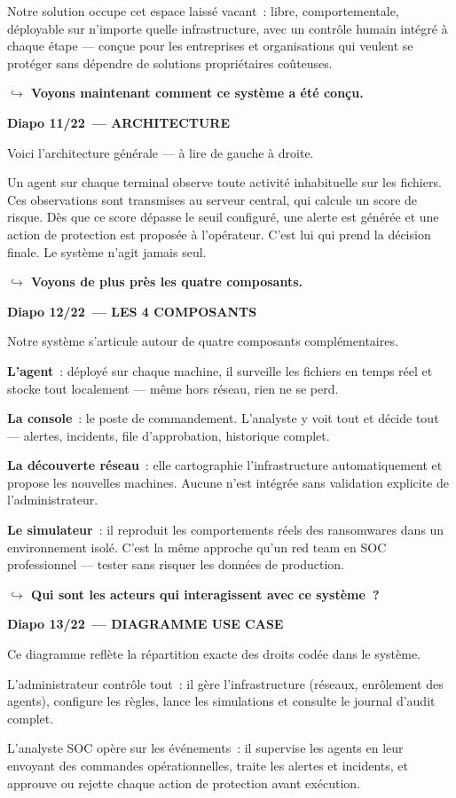 \documentclass[a4paper,11pt]{article}
\newcommand{\notehead}[2]{%
  \par\vspace{14pt}%
  {\color{white}\colorbox{primary}{\parbox{\dimexpr\linewidth-12pt}{\vspace{3pt}%
    \bfseries\large Diapo #1~--- #2\vspace{3pt}}}}%
  \par\vspace{6pt}%
}
\newcommand{\pivot}[1]{%
  \par\vspace{3pt}%
  {\color{transition}\small\bfseries $\hookrightarrow$ #1}%
}
\begin{document}
Notre solution occupe cet espace laissé vacant~: libre, comportementale, déployable sur
  n'importe quelle infrastructure, avec un contrôle humain intégré à chaque étape --- conçue pour
  les entreprises et organisations qui veulent se protéger sans dépendre de solutions propriétaires
  coûteuses.
\pivot{Voyons maintenant comment ce système a été conçu.}

\notehead{11/22}{ARCHITECTURE}
Voici l'architecture générale --- à lire de gauche à droite.

Un agent sur chaque terminal observe toute activité inhabituelle sur les fichiers. Ces observations
  sont transmises au serveur central, qui calcule un score de risque. Dès que ce score dépasse le
  seuil configuré, une alerte est générée et une action de protection est proposée à l'opérateur.
  C'est lui qui prend la décision finale. Le système n'agit jamais seul.
\pivot{Voyons de plus près les quatre composants.}

\notehead{12/22}{LES 4 COMPOSANTS}
Notre système s'articule autour de quatre composants complémentaires.

\textbf{L'agent}~: déployé sur chaque machine, il surveille les fichiers en temps réel et stocke
  tout localement --- même hors réseau, rien ne se perd.

\textbf{La console}~: le poste de commandement. L'analyste y voit tout et décide tout ---
  alertes, incidents, file d'approbation, historique complet.

\textbf{La découverte réseau}~: elle cartographie l'infrastructure automatiquement et propose les
  nouvelles machines. Aucune n'est intégrée sans validation explicite de l'administrateur.

\textbf{Le simulateur}~: il reproduit les comportements réels des ransomwares dans un environnement
  isolé. C'est la même approche qu'un red team en SOC professionnel --- tester sans risquer les
  données de production.
\pivot{Qui sont les acteurs qui interagissent avec ce système~?}

\notehead{13/22}{DIAGRAMME USE CASE}
Ce diagramme reflète la répartition exacte des droits codée dans le système.

L'administrateur contrôle tout~: il gère l'infrastructure (réseaux, enrôlement des agents),
  configure les règles, lance les simulations et consulte le journal d'audit complet.

L'analyste SOC opère sur les événements~: il supervise les agents en leur envoyant des
  commandes opérationnelles, traite les alertes et incidents, et approuve ou rejette
  chaque action de protection avant exécution.
\end{document}
